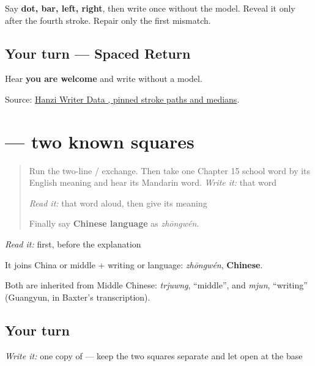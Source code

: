 Say \textbf{dot, bar, left, right}, then write \textbf{} once without the model. Reveal it only after the fourth stroke. Repair only the first mismatch.

\subsection*{Your turn — Spaced Return}
Hear \textbf{you are welcome} and write  without a model.

\begin{tcolorbox}[breakable,colback=teal!4,colframe=teal!35!black,title={Before you move on}]
Source: \href{https://raw.githubusercontent.com/chanind/hanzi-writer-data/68d10a4b21150cae5e1ebbd223eed289cf32d90c/data/\%E6\%96\%87.json}{Hanzi Writer Data , pinned stroke paths and medians}.
\end{tcolorbox}
\section[\texorpdfstring{\zh{中文} (zhōngwén)}{中文 (zhōngwén)}]{ — two known squares}

\label{lesson:ZH-C17-zhongwen}



\begin{quote}
Run the two-line  /  exchange. Then take one Chapter 15 school word by its English meaning and hear its Mandarin word. \emph{Write it:} that word

\emph{Read it:} that word aloud, then give its meaning

Finally say \textbf{Chinese language} as \emph{zhōngwén}.
\end{quote}

\begin{cousinweb}
\emph{Read it:} \textbf{} first, before the explanation

\begin{quote}
\textbf{}
\end{quote}

It joins China or middle + writing or language: \emph{zhōngwén}, \textbf{Chinese}.

Both are inherited from Middle Chinese: \emph{trjuwng}, \textquotedblleft{}middle\textquotedblright{}, and \emph{mjun}, \textquotedblleft{}writing\textquotedblright{} (Guangyun, in Baxter's transcription).
\end{cousinweb}

\subsection*{Your turn}
\emph{Write it:} one copy of \textbf{} — keep the two squares separate and let  open at the base

